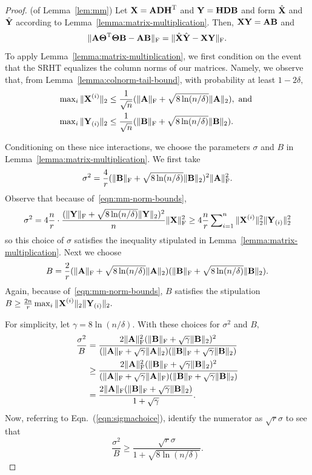 \begin{proof} (of Lemma~\ref{lem:mm})
 Let ${\bm{\mathrm{X}}} = {\bm{\mathrm{A}}} {\bm{\mathrm{D}}} {\bm{\mathrm{H}}}^{\textsc{T}}$ and ${\bm{\mathrm{Y}}} = {\bm{\mathrm{H}}} {\bm{\mathrm{D}}} {\bm{\mathrm{B}}}$ and form $\hat{{\bm{\mathrm{X}}}}$ and $\hat{{\bm{\mathrm{Y}}}}$ according to Lemma~\ref{lemma:matrix-multiplication}. Then, ${\bm{\mathrm{X}}} {\bm{\mathrm{Y}}} = {\bm{\mathrm{A}}} {\bm{\mathrm{B}}}$ and
\[
 \mbox{}\|{\bm{\mathrm{A}}} {\bm{\mathrm{\Theta}}}^{\textsc{T}} {\bm{\mathrm{\Theta}}} {\bm{\mathrm{B}}} - {\bm{\mathrm{A}}} {\bm{\mathrm{B}}}\|_\mathrm{F} = \mbox{}\|\hat{{\bm{\mathrm{X}}}} \hat{{\bm{\mathrm{Y}}}} - {\bm{\mathrm{X}}} {\bm{\mathrm{Y}}}\|_\mathrm{F}.
\]
To apply Lemma~\ref{lemma:matrix-multiplication}, we first condition on the event that the SRHT equalizes the column norms of our matrices. Namely, we observe that, from Lemma~\ref{lemma:colnorm-tail-bound}, with probability at least $1 - 2\delta,$
\begin{align}
 \label{eqn:mm-norm-bounds}
 \max\nolimits_i \TNorm{\matX^{(i)}} & \leq \frac{1}{\sqrt{n}} (\FNorm{\matA} + \sqrt{8 \ln(n/\delta)} \TNorm{\matA}), \text{ and } \\
 \max\nolimits_i \TNorm{\matY_{(i)}} & \leq \frac{1}{\sqrt{n}} (\FNorm{\matB} + \sqrt{8 \ln(n/\delta)}\TNorm{\matB}). \notag
\end{align}

Conditioning on these nice interactions, we choose the parameters $\sigma$ and $B$ in Lemma~\ref{lemma:matrix-multiplication}. We first take
\begin{equation}
\label{eqn:sigmachoice}
\sigma^2 = \frac{4}{r} (\FNorm{\matB} + \sqrt{8 \ln(n/\delta)}\TNorm{\matB})^2 \FNormS{\matA}.
\end{equation}
Observe that because of~\eqref{eqn:mm-norm-bounds},
\[
 \sigma^2 = 4 {n\over r} \cdot {(\mbox{}\|{\ensuremath{\bm{\mathrm{Y}}}}\|_\mathrm{F}  + \sqrt{8 \ln(n/\delta)}\mbox{}\|{\ensuremath{\bm{\mathrm{Y}}}}\|_2 )^2\over n} \mbox{}\|{\bm{\mathrm{X}}}\|_\mathrm{F}^2 \geq 4 {n\over r} \sum\nolimits_{i=1}^n \mbox{}\|{\bm{\mathrm{X}}}^{(i)}\|_2^2 \mbox{}\|{\bm{\mathrm{Y}}}_{(i)}\|_2^2
\]
so this choice of $\sigma$ satisfies the inequality stipulated in Lemma~\ref{lemma:matrix-multiplication}. Next we choose
\[
 B = {2\over r}(\mbox{}\|{\bm{\mathrm{A}}}\|_\mathrm{F} + \sqrt{8 \ln(n/\delta)} \mbox{}\|{\bm{\mathrm{A}}}\|_2)(\mbox{}\|{\bm{\mathrm{B}}}\|_\mathrm{F} + \sqrt{8 \ln(n/\delta)} \mbox{}\|{\bm{\mathrm{B}}}\|_2).
\]
Again, because of~\eqref{eqn:mm-norm-bounds}, $B$ satisfies the stipulation $B \geq {2 n\over r}\max_i \mbox{}\|{\bm{\mathrm{X}}}^{(i)}\|_2 \mbox{}\|{\bm{\mathrm{Y}}}_{(i)}\|_2.$

For simplicity, let $\gamma = 8\ln(n/\delta).$ With these choices for $\sigma^2$ and $B,$
\begin{align*}
 {\sigma^2\over B} & = { 2 \mbox{}\|{\bm{\mathrm{A}}}\|_\mathrm{F}^2 (\mbox{}\|{\bm{\mathrm{B}}}\|_\mathrm{F} + \sqrt{\gamma} \mbox{}\|{\bm{\mathrm{B}}}\|_2)^2 \over  (\mbox{}\|{\bm{\mathrm{A}}}\|_\mathrm{F} + \sqrt{\gamma} \mbox{}\|{\bm{\mathrm{A}}}\|_2) (\mbox{}\|{\bm{\mathrm{B}}}\|_\mathrm{F} + \sqrt{\gamma} \mbox{}\|{\bm{\mathrm{B}}}\|_2)} \\
 & \geq { 2 \mbox{}\|{\ensuremath{\bm{\mathrm{A}}}}\|_\mathrm{F}^2 (\mbox{}\|{\ensuremath{\bm{\mathrm{B}}}}\|_\mathrm{F}  + \sqrt{\gamma} \mbox{}\|{\ensuremath{\bm{\mathrm{B}}}}\|_2 )^2 \over  (\mbox{}\|{\ensuremath{\bm{\mathrm{A}}}}\|_\mathrm{F}  + \sqrt{\gamma} \mbox{}\|{\ensuremath{\bm{\mathrm{A}}}}\|_\mathrm{F} ) (\mbox{}\|{\ensuremath{\bm{\mathrm{B}}}}\|_\mathrm{F}  + \sqrt{\gamma} \mbox{}\|{\ensuremath{\bm{\mathrm{B}}}}\|_2 )} \\
 & = {2 \mbox{}\|{\bm{\mathrm{A}}}\|_\mathrm{F}(\mbox{}\|{\bm{\mathrm{B}}}\|_\mathrm{F} + \sqrt{\gamma}\mbox{}\|{\bm{\mathrm{B}}}\|_2)\over 1 + \sqrt{\gamma}}.
\end{align*}
Now, referring to Eqn.~(\ref{eqn:sigmachoice}), identify the numerator as $\sqrt{r}\sigma$ to see that
\[
 \frac{\sigma^2}{B} \geq \frac{\sqrt{r} \sigma}{1+ \sqrt{8 \ln(n/\delta)}}.
\]


\end{proof}
